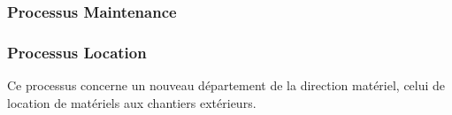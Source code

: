 

                \subsubsection{Processus Maintenance}



                \subsubsection{Processus Location}
                    Ce processus concerne un nouveau département de la direction matériel, celui de location de matériels aux chantiers extérieurs.




